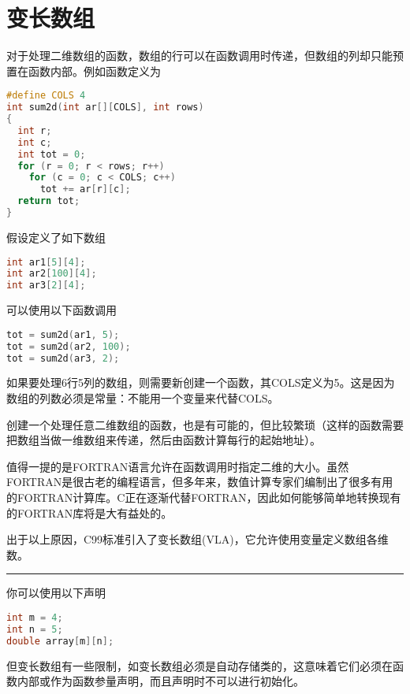 \section{变长数组}
\begin{frame}[fragile]\ft{\secname}
对于处理二维数组的函数，数组的行可以在函数调用时传递，但数组的列却只能预置在函数内部。例如函数定义为
\begin{lstlisting}[language=c,backgroundcolor=\color{red!20}]
#define COLS 4
int sum2d(int ar[][COLS], int rows)
{
  int r;
  int c;
  int tot = 0;
  for (r = 0; r < rows; r++)
    for (c = 0; c < COLS; c++)
      tot += ar[r][c];
  return tot;
}
\end{lstlisting}
\end{frame}

\begin{frame}[fragile]\ft{\secname}
假设定义了如下数组
\begin{lstlisting}[language=c,backgroundcolor=\color{red!20}]
int ar1[5][4];
int ar2[100][4];
int ar3[2][4];
\end{lstlisting}
可以使用以下函数调用
\begin{lstlisting}[language=c,backgroundcolor=\color{red!20}]
tot = sum2d(ar1, 5);
tot = sum2d(ar2, 100);
tot = sum2d(ar3, 2);
\end{lstlisting}
\end{frame}

\begin{frame}[fragile]\ft{\secname}
如果要处理6行5列的数组，则需要新创建一个函数，其COLS定义为5。这是因为数组的列数必须是常量：不能用一个变量来代替COLS。
\end{frame}

\begin{frame}[fragile]\ft{\secname}
创建一个处理任意二维数组的函数，也是有可能的，但比较繁琐（这样的函数需要把数组当做一维数组来传递，然后由函数计算每行的起始地址）。
\end{frame}

\begin{frame}[fragile]\ft{\secname}
值得一提的是\textcolor{acolor1}{FORTRAN语言允许在函数调用时指定二维的大小}。虽然FORTRAN是很古老的编程语言，但多年来，数值计算专家们编制出了很多有用的FORTRAN计算库。C正在逐渐代替FORTRAN，因此如何能够简单地转换现有的FORTRAN库将是大有益处的。
\end{frame}

\begin{frame}[fragile]\ft{\secname}
出于以上原因，C99标准引入了变长数组(VLA)，它允许使用变量定义数组各维数。\pause

\rule{\textwidth}{.2mm}
 \vspace{.1mm}

你可以使用以下声明
\begin{lstlisting}[language=c,backgroundcolor=\color{red!20}]
int m = 4;
int n = 5;
double array[m][n];
\end{lstlisting}
但变长数组有一些限制，如变长数组必须是自动存储类的，这意味着它们必须在函数内部或作为函数参量声明，而且声明时不可以进行初始化。
\end{frame}

